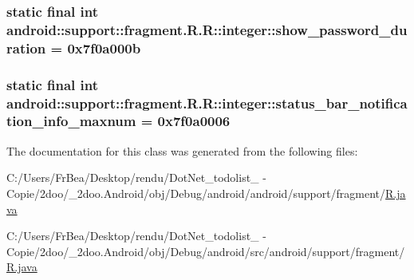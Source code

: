 \hypertarget{classandroid_1_1support_1_1fragment_1_1_r_1_1integer_0246d861a1bf118de2a48eae1e6e7494}{
\subsubsection[{show\_\-password\_\-duration}]{\setlength{\rightskip}{0pt plus 5cm}static final int android::support::fragment.R.R::integer::show\_\-password\_\-duration = 0x7f0a000b}}
\label{classandroid_1_1support_1_1fragment_1_1_r_1_1integer_0246d861a1bf118de2a48eae1e6e7494}


\hypertarget{classandroid_1_1support_1_1fragment_1_1_r_1_1integer_491829a99f0ebd388fc6f9ba4ac91b04}{
\subsubsection[{status\_\-bar\_\-notification\_\-info\_\-maxnum}]{\setlength{\rightskip}{0pt plus 5cm}static final int android::support::fragment.R.R::integer::status\_\-bar\_\-notification\_\-info\_\-maxnum = 0x7f0a0006}}
\label{classandroid_1_1support_1_1fragment_1_1_r_1_1integer_491829a99f0ebd388fc6f9ba4ac91b04}




The documentation for this class was generated from the following files:\begin{CompactItemize}
\item 
C:/Users/FrBea/Desktop/rendu/DotNet\_\-todolist\_ - Copie/2doo/\_\-2doo.Android/obj/Debug/android/android/support/fragment/\hyperlink{android_2support_2fragment_2_r_8java}{R.java}\item 
C:/Users/FrBea/Desktop/rendu/DotNet\_\-todolist\_ - Copie/2doo/\_\-2doo.Android/obj/Debug/android/src/android/support/fragment/\hyperlink{src_2android_2support_2fragment_2_r_8java}{R.java}\end{CompactItemize}
